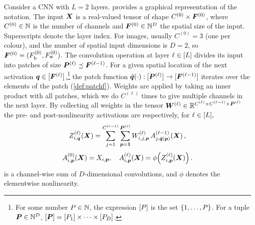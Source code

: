 \documentclass[accepted]{uai2021} %
\newcommand{\layerAs}[2]{Z^{(#1)}_{#2}(\vX)}
\newcommand{\layerC}[1]{C^{(#1)}}
\newcommand{\layerNLAs}[2]{A^{(#1)}_{#2}(\vX)}
\newcommand{\layerWs}[1]{W^{(#1)}}
\newcommand{\layerW}[1]{\mW^{(#1)}}
\newcommand{\layersizebase}{\vF}
\newcommand{\layersize}[1]{{\layersizebase^{\bra{#1}}}}
\newcommand{\layerw}[1]{F_\text{w}^{(#1)}}
\newcommand{\layerh}[1]{F_\text{h}^{(#1)}}
\newcommand{\patchsizebase}{\vP}
\newcommand{\patchsizebases}{P}
\newcommand{\patchsize}[1]{{\patchsizebase^{\bra{#1}}}}
\newcommand{\patchw}[1]{P_\text{w}^{(#1)}}
\newcommand{\patchh}[1]{P_\text{h}^{(#1)}}
\newcommand{\patchf}[2]{{\tilde#1\bra{#2}}}
\newcommand{\convpatch}[1]{{\text{im}\bra{\tilde#1}}}
\newcommand{\chan}{i}
\newcommand{\prevchan}{j}   %
\newcommand{\patch}{\vp}               %
\newcommand{\nextpatch}{\vq}
\newcommand{\0}{\boldsymbol{0}}
\newcommand{\1}{\boldsymbol{1}}
\newcommand{\crefp}[1]{(\cref{#1})}
\begin{document}
Consider a CNN with $L=2$ layers.  provides a graphical representation of the notation.
The input ${\bm{X}}$ is a real-valued tensor of shape ${\layerC{0} \times \layersize{0}}$, where $\layerC{0} \in \sN$ is the number of channels and $\layersize{0} \in \sN^{D}$ the spatial size of the input.  Superscripts denote the layer index.
For images, usually $\layerC{0}=3$ (one per colour), and the number of spatial input dimensions is $D=2$, so $\layersize{0} = (\layerh{0}, \layerw{0}).$
The convolution operation at layer $\ell\in[L]$ divides its input into patches of size
$\patchsize{\ell} \preceq \layersize{\ell-1}$. For a given spatial location of the next activation
$\nextpatch\in\countto{\layersize{\ell}}$,\footnote{For some number
  $\patchsizebases\in \sN$, the expression $\countto{\patchsizebases}$ is the
  set $\cb{1,\dots,\patchsizebases}$. For a tuple $\patchsizebase\in\sN^{D}$,
  $\countto{\patchsizebase} = \countto{\patchsizebases_{1}}\times \dots \times \countto{\patchsizebases_{D}}$.}
 the patch function
$\patchf{\nextpatch}{\cdot}: \countto{\patchsize{\ell}} \to \countto{\layersize{\ell-1}}$
iterates over the elements of the patch \crefp{def:patchf}. Weights are applied by taking an inner product with all patches, which we do $\layerC{\ell}$ times to give multiple channels in the next layer. By collecting all weights in the tensor $\layerW{\ell}\in\sR^{\layerC{\ell}\times \layerC{\ell-1}\times \patchsize{\ell}}$ the pre- and post-nonlinearity activations are respectively, for $\ell\in[L],$
\begin{equation}
    \layerAs{\ell}{\chan,\nextpatch} = \sum_{\prevchan=1}^{\layerC{\ell-1}} \sum_{\patch=\1}^{\patchsize{\ell}} \layerWs{\ell}_{\chan,\prevchan,\patch}\, \layerNLAs{\ell-1}{\prevchan,\patchf{\nextpatch}{\patch}}\,,
    \label{eq:deep-recursion}
\end{equation}
\begin{equation}
  \layerNLAs{0}{\chan,\patch} = X_{\chan,\patch},\quad \layerNLAs{\ell}{\chan,\patch} = \phi\bra{\layerAs{\ell}{\chan,\patch}}\,.
  \label{eq:deep-activations}
\end{equation}
 is a channel-wise sum of $D$-dimensional convolutions, and $\phi$ denotes the elementwise nonlinearity.
\end{document}
